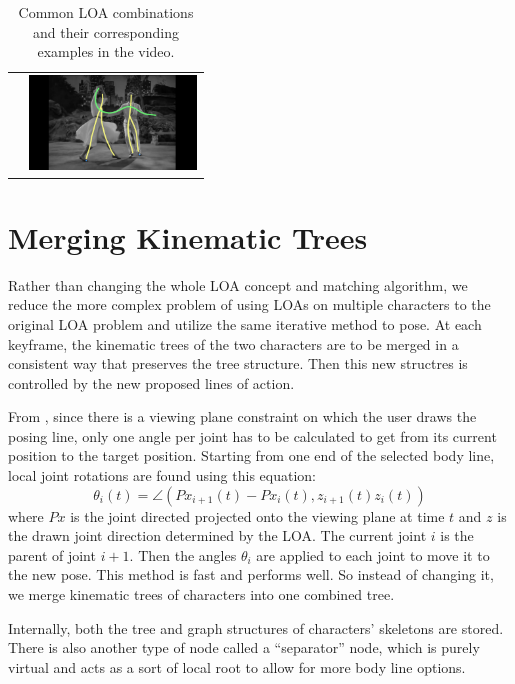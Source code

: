 \begin{table}[h!]
\begin{tabular}{ll}
\begin{minipage}{.28\textwidth}
    \end{minipage} & 
    \begin{minipage}{.28\textwidth}
      \includegraphics[width=\linewidth, height=25mm]{img/keyframe_case_10_(5)}
    \end{minipage}
\end{tabular}
\caption{Common LOA combinations and their corresponding examples in the video.}
\label{tab:combos}
\end{table}

\section{Merging Kinematic Trees}
Rather than changing the whole LOA concept and matching algorithm, we reduce the more complex problem of using LOAs on multiple characters to the original LOA problem and utilize the same iterative method to pose. At each keyframe, the kinematic trees of the two characters are to be merged in a consistent way that preserves the tree structure. Then this new structres is controlled by the new proposed lines of action.

From \citep{guay2015space}, since there is a viewing plane constraint on which the user draws the posing line, only one angle per joint has to be calculated to get from its current position to the target position. Starting from one end of the selected body line, local joint rotations are found using this equation:
\begin{equation}\label{eq:matching}
\theta_i(t) = \angle (Px_{i+1}(t) - Px_i(t), z_{i+1}(t)z_i(t)) 
\end{equation}
where $Px$ is the joint directed projected onto the viewing plane at time $t$ and $z$ is the drawn joint direction determined by the LOA. The current joint $i$ is the parent of joint $i+1$. Then the angles $\theta_i$ are applied to each joint to move it to the new pose. This method is fast and performs well. So instead of changing it, we merge kinematic trees of characters into one combined tree. 

Internally, both the tree and graph structures of characters' skeletons are stored. There is also another type of node called a ``separator'' node, which is purely virtual and acts as a sort of local root to allow for more body line options.


